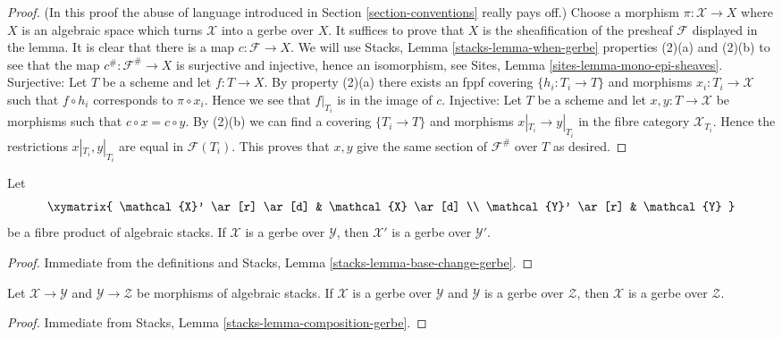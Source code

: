 \begin{proof}
(In this proof the abuse of language introduced in
Section \ref{section-conventions}
really pays off.)
Choose a morphism $\pi : \mathcal{X} \to X$ where $X$ is an
algebraic space which turns $\mathcal{X}$ into a gerbe over $X$.
It suffices to prove that $X$ is the sheafification of the presheaf
$\mathcal{F}$ displayed in the lemma.
It is clear that there is a map $c : \mathcal{F} \to X$.
We will use
Stacks, Lemma \ref{stacks-lemma-when-gerbe}
properties (2)(a) and (2)(b) to see that the map $c^\# : \mathcal{F}^\# \to X$
is surjective and injective, hence an isomorphism, see
Sites, Lemma \ref{sites-lemma-mono-epi-sheaves}.
Surjective: Let $T$ be a scheme and let $f : T \to X$. By property (2)(a)
there exists an fppf covering $\{h_i : T_i \to T\}$ and morphisms
$x_i : T_i \to \mathcal{X}$ such that $f \circ h_i$ corresponds to
$\pi \circ x_i$. Hence we see that $f|_{T_i}$ is in the image of $c$.
Injective: Let $T$ be a scheme and let $x, y : T \to \mathcal{X}$
be morphisms such that $c \circ x = c \circ y$.
By (2)(b) we can find a covering $\{T_i \to T\}$ and morphisms
$x|_{T_i} \to y|_{T_i}$ in the fibre category $\mathcal{X}_{T_i}$.
Hence the restrictions $x|_{T_i}, y|_{T_i}$ are equal in
$\mathcal{F}(T_i)$. This proves that $x, y$ give the same section
of $\mathcal{F}^\#$ over $T$ as desired.
\end{proof}

\begin{lemma}
\label{lemma-base-change-gerbe}
Let
$$
\xymatrix{
\mathcal{X}' \ar[r] \ar[d] & \mathcal{X} \ar[d] \\
\mathcal{Y}' \ar[r] & \mathcal{Y}
}
$$
be a fibre product of algebraic stacks.
If $\mathcal{X}$ is a gerbe over $\mathcal{Y}$, then
$\mathcal{X}'$ is a gerbe over $\mathcal{Y}'$.
\end{lemma}

\begin{proof}
Immediate from the definitions and
Stacks, Lemma \ref{stacks-lemma-base-change-gerbe}.
\end{proof}

\begin{lemma}
\label{lemma-composition-gerbe}
Let $\mathcal{X} \to \mathcal{Y}$ and $\mathcal{Y} \to \mathcal{Z}$
be morphisms of algebraic stacks. If $\mathcal{X}$ is a gerbe over
$\mathcal{Y}$ and $\mathcal{Y}$ is a gerbe over $\mathcal{Z}$, then
$\mathcal{X}$ is a gerbe over $\mathcal{Z}$.
\end{lemma}

\begin{proof}
Immediate from
Stacks, Lemma \ref{stacks-lemma-composition-gerbe}.
\end{proof}

